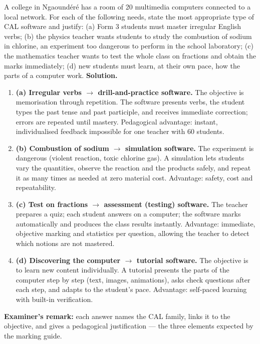 \documentclass[11pt]{article}
\begin{document}
\begin{exoresolu}
A college in Ngaoundéré has a room of 20 multimedia computers connected to a local network. For each of the following needs, state the most appropriate type of CAL software and justify: (a) Form 3 students must master irregular English verbs; (b) the physics teacher wants students to study the combustion of sodium in chlorine, an experiment too dangerous to perform in the school laboratory; (c) the mathematics teacher wants to test the whole class on fractions and obtain the marks immediately; (d) new students must learn, at their own pace, how the parts of a computer work.
\tcblower
\textbf{Solution.}
\begin{enumerate}
\item \textbf{(a) Irregular verbs $\rightarrow$ drill-and-practice software.} The objective is memorisation through repetition. The software presents verbs, the student types the past tense and past participle, and receives immediate correction; errors are repeated until mastery. Pedagogical advantage: instant, individualised feedback impossible for one teacher with 60 students.
\item \textbf{(b) Combustion of sodium $\rightarrow$ simulation software.} The experiment is dangerous (violent reaction, toxic chlorine gas). A simulation lets students vary the quantities, observe the reaction and the products safely, and repeat it as many times as needed at zero material cost. Advantage: safety, cost and repeatability.
\item \textbf{(c) Test on fractions $\rightarrow$ assessment (testing) software.} The teacher prepares a quiz; each student answers on a computer; the software marks automatically and produces the class results instantly. Advantage: immediate, objective marking and statistics per question, allowing the teacher to detect which notions are not mastered.
\item \textbf{(d) Discovering the computer $\rightarrow$ tutorial software.} The objective is to learn new content individually. A tutorial presents the parts of the computer step by step (text, images, animations), asks check questions after each step, and adapts to the student's pace. Advantage: self-paced learning with built-in verification.
\end{enumerate}
\textbf{Examiner's remark:} each answer names the CAL family, links it to the objective, and gives a pedagogical justification — the three elements expected by the marking guide.
\end{exoresolu}
\end{document}
